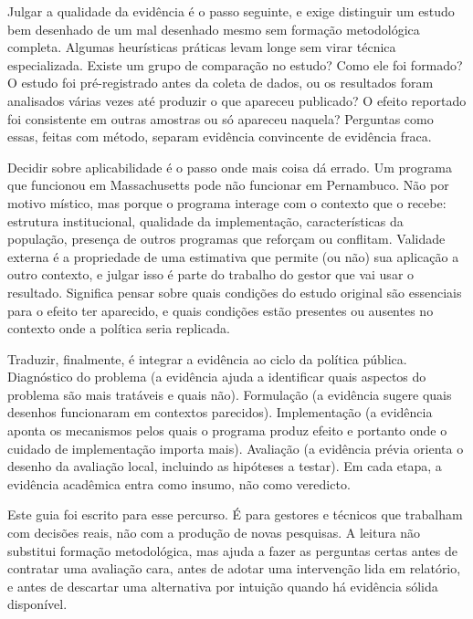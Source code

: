 \documentclass[12pt, a4paper, openany]{book}
\begin{document}
Julgar a qualidade da evidência é o passo seguinte, e exige distinguir
um estudo bem desenhado de um mal desenhado mesmo sem formação
metodológica completa. Algumas heurísticas práticas levam longe sem virar
técnica especializada. Existe um grupo de comparação no estudo? Como ele
foi formado? O estudo foi pré-registrado antes da coleta de dados, ou os
resultados foram analisados várias vezes até produzir o que apareceu
publicado? O efeito reportado foi consistente em outras amostras ou só
apareceu naquela? Perguntas como essas, feitas com método, separam
evidência convincente de evidência fraca.

Decidir sobre aplicabilidade é o passo onde mais coisa dá errado. Um
programa que funcionou em Massachusetts pode não funcionar em Pernambuco.
Não por motivo místico, mas porque o programa interage com o contexto
que o recebe: estrutura institucional, qualidade da implementação,
características da população, presença de outros programas que reforçam
ou conflitam. Validade externa é a propriedade de uma estimativa que
permite (ou não) sua aplicação a outro contexto, e julgar isso é parte do
trabalho do gestor que vai usar o resultado. Significa pensar sobre quais
condições do estudo original são essenciais para o efeito ter aparecido,
e quais condições estão presentes ou ausentes no contexto onde a política
seria replicada.

Traduzir, finalmente, é integrar a evidência ao ciclo da política
pública. Diagnóstico do problema (a evidência ajuda a identificar quais
aspectos do problema são mais tratáveis e quais não). Formulação (a
evidência sugere quais desenhos funcionaram em contextos parecidos).
Implementação (a evidência aponta os mecanismos pelos quais o programa
produz efeito e portanto onde o cuidado de implementação importa mais).
Avaliação (a evidência prévia orienta o desenho da avaliação local,
incluindo as hipóteses a testar). Em cada etapa, a evidência acadêmica
entra como insumo, não como veredicto.

Este guia foi escrito para esse percurso. É para gestores e técnicos que
trabalham com decisões reais, não com a produção de novas pesquisas. A
leitura não substitui formação metodológica, mas ajuda a fazer as
perguntas certas antes de contratar uma avaliação cara, antes de adotar
uma intervenção lida em relatório, e antes de descartar uma alternativa
por intuição quando há evidência sólida disponível.
\newpage

\thispagestyle{empty}
\end{document}
